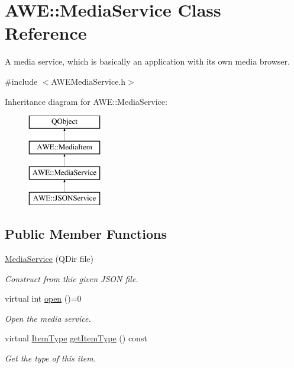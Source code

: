 \hypertarget{class_a_w_e_1_1_media_service}{\section{A\-W\-E\-:\-:Media\-Service Class Reference}
\label{class_a_w_e_1_1_media_service}
}


A media service, which is basically an application with its own media browser.  




{\ttfamily \#include $<$A\-W\-E\-Media\-Service.\-h$>$}

Inheritance diagram for A\-W\-E\-:\-:Media\-Service\-:\begin{figure}[H]
\begin{center}
\leavevmode
\includegraphics[height=4.000000cm]{class_a_w_e_1_1_media_service}
\end{center}
\end{figure}
\subsection*{Public Member Functions}
\begin{DoxyCompactItemize}
\item 
\hyperlink{class_a_w_e_1_1_media_service_a4d19a081ed555177fe61286216c56671}{Media\-Service} (Q\-Dir file)
\begin{DoxyCompactList}\small\item\em Construct from thie given J\-S\-O\-N file. \end{DoxyCompactList}\item 
virtual int \hyperlink{class_a_w_e_1_1_media_service_ad13c100468482ce42880941bbeca4623}{open} ()=0
\begin{DoxyCompactList}\small\item\em Open the media service. \end{DoxyCompactList}\item 
virtual \hyperlink{namespace_a_w_e_ad175a5b8a86bf7848825c9bd94c41470}{Item\-Type} \hyperlink{class_a_w_e_1_1_media_service_a680d2f9fd50b27cb7156c3a5777dee12}{get\-Item\-Type} () const 
\begin{DoxyCompactList}\small\item\em Get the type of this item. \end{DoxyCompactList}\end{DoxyCompactItemize}
